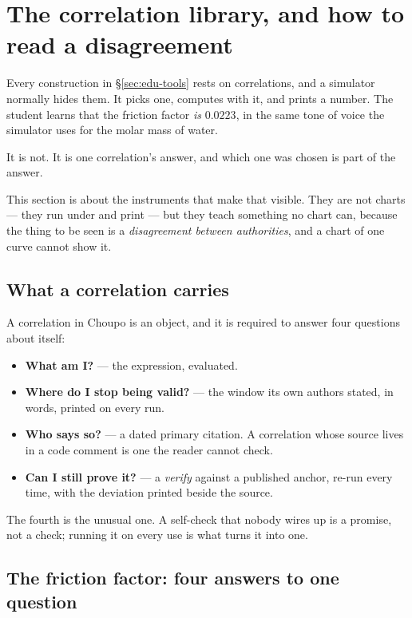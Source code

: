 \documentclass[11pt,a4paper]{article}
\begin{document}
\section{The correlation library, and how to read a disagreement}
\label{sec:edu-correlations}

Every construction in \S\ref{sec:edu-tools} rests on correlations, and a
simulator normally hides them.  It picks one, computes with it, and prints
a number.  The student learns that the friction factor \emph{is} $0.0223$,
in the same tone of voice the simulator uses for the molar mass of water.

It is not.  It is one correlation's answer, and which one was chosen is
part of the answer.

This section is about the instruments that make that visible.  They are
not charts --- they run under  and print --- but they
teach something no chart can, because the thing to be seen is a
\emph{disagreement between authorities}, and a chart of one curve cannot
show it.

\subsection{What a correlation carries}

A correlation in Choupo is an object, and it is required to answer four
questions about itself:

\begin{itemize}[leftmargin=*,nosep,topsep=2pt]
  \item \textbf{What am I?} --- the expression, evaluated.
  \item \textbf{Where do I stop being valid?} --- the window its own
        authors stated, in words, printed on every run.
  \item \textbf{Who says so?} --- a dated primary citation.  A correlation
        whose source lives in a code comment is one the reader cannot
        check.
  \item \textbf{Can I still prove it?} --- a \emph{verify} against a
        published anchor, re-run every time, with the deviation printed
        beside the source.
\end{itemize}

The fourth is the unusual one.  A self-check that nobody wires up is a
promise, not a check; running it on every use is what turns it into one.

\subsection{The friction factor: four answers to one question}
\label{sec:edu-friction}
\end{document}
